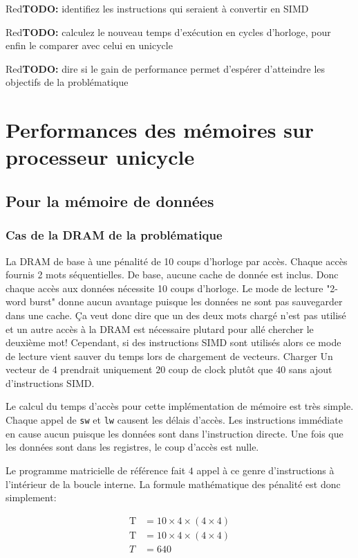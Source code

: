 \documentclass[a11paper]{article}
\newcommand{\todo}[1]{\begin{color}{Red}\textbf{TODO:} #1\end{color}}
\begin{document}
\todo{identifiez les instructions qui seraient à convertir en SIMD}

\todo{calculez le nouveau temps d'exécution en cycles d'horloge, pour enfin le
comparer avec celui en unicycle}

\todo{dire si le gain de performance permet d'espérer d'atteindre les objectifs
de la problématique}



\section{Performances des mémoires sur processeur unicycle}
\subsection{Pour la mémoire de données}
\subsubsection{Cas de la DRAM de la problématique}

La DRAM de base à une pénalité de 10 coups d'horloge par accès. Chaque accès
fournis 2 mots séquentielles. De base, aucune cache de donnée est inclus.
Donc chaque accès aux données nécessite 10 coups d'horloge. Le mode de
lecture "2-word burst" donne aucun avantage puisque les données ne sont pas
sauvegarder dans une cache. Ça veut donc dire que un des deux mots chargé
n'est pas utilisé et un autre accès à la DRAM est nécessaire plutard pour
allé chercher le deuxième mot! Cependant, si des instructions SIMD sont
utilisés alors ce mode de lecture vient sauver du temps lors de chargement de
vecteurs. Charger Un vecteur de $4$ prendrait uniquement $20$ coup de clock
plutôt que $40$ sans ajout d'instructions SIMD.

Le calcul du temps d'accès pour cette implémentation de mémoire est très
simple. Chaque appel de \verb|sw| et \verb|lw| causent les délais d'accès.
Les instructions immédiate en cause aucun puisque les données sont dans
l'instruction directe. Une fois que les données sont dans les registres, le
coup d'accès est nulle.

Le programme matricielle de référence fait $4$ appel à ce genre
d'instructions à l'intérieur de la boucle interne. La formule mathématique
des pénalité est donc simplement:

\begin{align}
  \text{T} &= 10\times4\times(4\times4) \\
  \text{T} &= 10\times4\times(4\times4) \\
  T        &= 640
\end{align}
\end{document}
